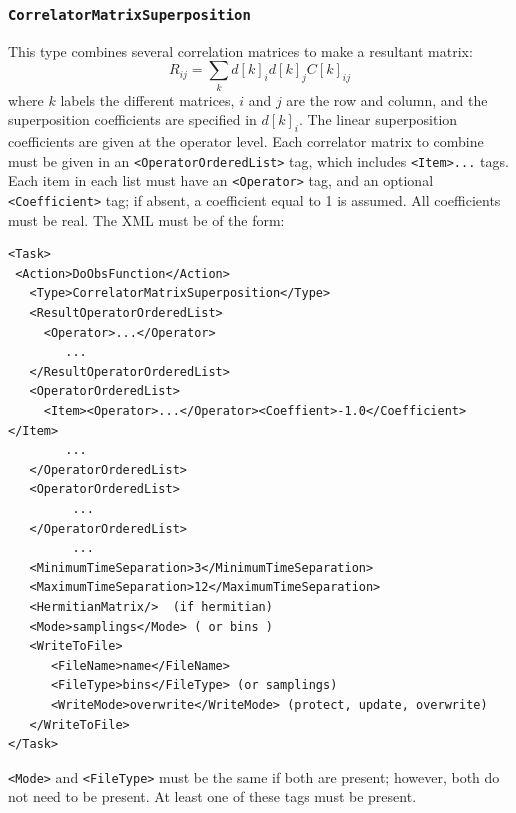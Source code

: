 \documentclass[12pt]{article}
\newcommand{\vb}{\texttt}
\begin{document}
\subsubsection{\vb{CorrelatorMatrixSuperposition}}
This type combines several correlation
matrices to make a resultant matrix:
\[
R_{i j} = \sum_k  d[k]_i d[k]_j  C[k]_{i j}
\]
where $k$ labels the different matrices, $i$ and $j$ are the row and column,
and the superposition coefficients are specified in $d[k]_i$.
The linear superposition coefficients are given at the operator
level.  Each correlator matrix to combine must be given in an
\vb{<OperatorOrderedList>} tag, which includes \vb{<Item>...} tags.  Each
item in each list must have an \vb{<Operator>} tag, and an optional
\vb{<Coefficient>} tag; if absent, a coefficient equal to 1 is assumed.
All coefficients must be real.
The XML must be of the form:
\begin{verbatim}
<Task>
 <Action>DoObsFunction</Action>
   <Type>CorrelatorMatrixSuperposition</Type>
   <ResultOperatorOrderedList>
     <Operator>...</Operator>
        ...
   </ResultOperatorOrderedList>
   <OperatorOrderedList>
     <Item><Operator>...</Operator><Coeffient>-1.0</Coefficient></Item>
        ...
   </OperatorOrderedList>
   <OperatorOrderedList>
         ...
   </OperatorOrderedList>
         ...
   <MinimumTimeSeparation>3</MinimumTimeSeparation>
   <MaximumTimeSeparation>12</MaximumTimeSeparation>
   <HermitianMatrix/>  (if hermitian)
   <Mode>samplings</Mode> ( or bins )
   <WriteToFile>
      <FileName>name</FileName>
      <FileType>bins</FileType> (or samplings)
      <WriteMode>overwrite</WriteMode> (protect, update, overwrite)
   </WriteToFile>
</Task>
\end{verbatim}
\vb{<Mode>} and \vb{<FileType>} must be the same if both are present;
however, both do not need to be present.  At least one of these tags must 
be present.
\end{document}

